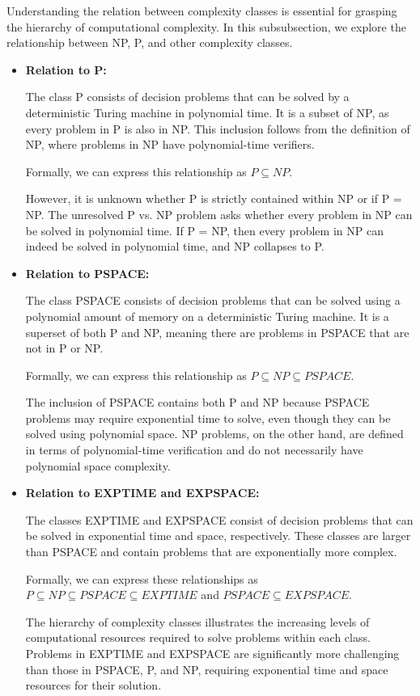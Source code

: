 \documentclass[12pt]{book} %
\begin{document}
Understanding the relation between complexity classes is essential for grasping the hierarchy of computational complexity. In this subsubsection, we explore the relationship between NP, P, and other complexity classes.
\begin{itemize}
    \item \textbf{Relation to P:}

The class P consists of decision problems that can be solved by a deterministic Turing machine in polynomial time. It is a subset of NP, as every problem in P is also in NP. This inclusion follows from the definition of NP, where problems in NP have polynomial-time verifiers.

Formally, we can express this relationship as \(P \subseteq NP\).

However, it is unknown whether P is strictly contained within NP or if P = NP. The unresolved P vs. NP problem asks whether every problem in NP can be solved in polynomial time. If P = NP, then every problem in NP can indeed be solved in polynomial time, and NP collapses to P.

\item \textbf{Relation to PSPACE:}

The class PSPACE consists of decision problems that can be solved using a polynomial amount of memory on a deterministic Turing machine. It is a superset of both P and NP, meaning there are problems in PSPACE that are not in P or NP.

Formally, we can express this relationship as \(P \subseteq NP \subseteq PSPACE\).

The inclusion of PSPACE contains both P and NP because PSPACE problems may require exponential time to solve, even though they can be solved using polynomial space. NP problems, on the other hand, are defined in terms of polynomial-time verification and do not necessarily have polynomial space complexity.

\item \textbf{Relation to EXPTIME and EXPSPACE:}

The classes EXPTIME and EXPSPACE consist of decision problems that can be solved in exponential time and space, respectively. These classes are larger than PSPACE and contain problems that are exponentially more complex.

Formally, we can express these relationships as \(P \subseteq NP \subseteq PSPACE \subseteq EXPTIME\) and \(PSPACE \subseteq EXPSPACE\).

The hierarchy of complexity classes illustrates the increasing levels of computational resources required to solve problems within each class. Problems in EXPTIME and EXPSPACE are significantly more challenging than those in PSPACE, P, and NP, requiring exponential time and space resources for their solution.
\end{itemize}
\end{document}
